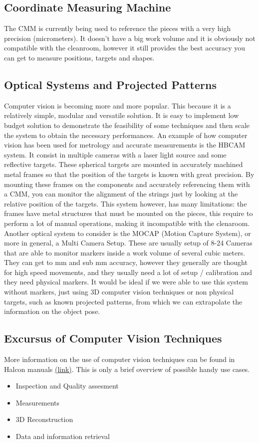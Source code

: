 \documentclass[12pt,a4paper]{article}
\begin{document}
\subsection{Coordinate Measuring Machine}
The CMM is currently being used to reference the pieces with a very high precision (micrometers). It doesn't have a big work volume and it is obviously not compatible with the cleanroom, however it still provides the best accuracy you can get to measure positions, targets and shapes. 

\subsection{Optical Systems and Projected Patterns}
Computer vision is becoming more and more popular. This because it is a relatively simple, modular and versatile solution. It is easy to implement low budget solution to demonstrate the feasibility of some techniques and then scale the system to obtain the necessary performances.
An example of how computer vision has been used for metrology and accurate measurements is the HBCAM system.
It consist in multiple cameras with a laser light source and some reflective targets. These spherical targets are mounted in accurately machined metal frames so that the position of the targets is known with great precision.
By mounting these frames on the components and accurately referencing them with a CMM, you can monitor the alignment of the strings just by looking at the relative position of the targets.
This system however, has many limitations: the frames have metal structures that must be mounted on the pieces, this require to perform a lot of manual operations, making it incompatible with the clenaroom.
Another optical system to consider is the MOCAP (Motion Capture System), or more in general, a Multi Camera Setup. These are usually setup of 8-24 Cameras that are able to monitor markers inside a work volume of several cubic meters. They can get to mm and sub mm accuracy, however they generally are thought for high speed movements, and they usually need a lot of setup / calibration and they need physical markers. It would be ideal if we were able to use this system without markers, just using 3D computer vision techniques or non physical targets, such as known projected patterns, from which we can extrapolate the information on the object pose.


\subsection{Excursus of Computer Vision Techniques}
More information on the use of computer vision techniques can be found in Halcon manuals \href{https://www.mvtec.com/products/halcon/documentation/}{(link)}. This is only a brief overview of possible handy use cases.
\begin{itemize}
    \item Inspection and Quality assesment
    \item Measurements
    \item 3D Reconstruction
    \item Data and information retrieval
\end{itemize}
\end{document}
